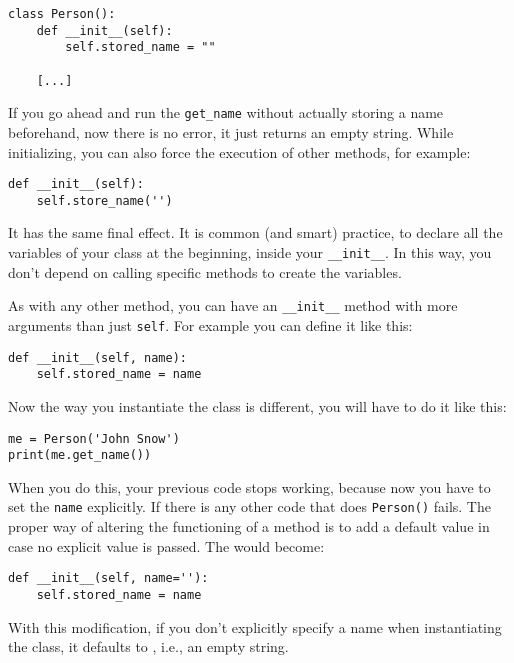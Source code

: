 \begin{verbatim}
class Person():
    def __init__(self):
        self.stored_name = ""

    [...]
\end{verbatim}

If you go ahead and run the \texttt{get_name} without actually storing a name beforehand, now there is no error, it just returns an empty string. While initializing, you can also force the execution of other methods, for example:

\begin{verbatim}
def __init__(self):
    self.store_name('')
\end{verbatim}

It has the same final effect. It is common (and smart) practice, to declare all the variables of your class at the beginning, inside your \texttt{__init__}. In this way, you don't depend on calling specific methods to create the variables.

As with any other method, you can have an \texttt{__init__} method with more arguments than just \texttt{self}. For example you can define it like this:

\begin{verbatim}
def __init__(self, name):
    self.stored_name = name
\end{verbatim}

Now the way you instantiate the class is different, you will have to do it like this:

\begin{verbatim}
me = Person('John Snow')
print(me.get_name())
\end{verbatim}

When you do this, your previous code stops working, because now you have to set the \texttt{name} explicitly. If there is any other code that does \texttt{Person()} fails. The proper way of altering the functioning of a method is to add a default value in case no explicit value is passed. The  would become:

\begin{verbatim}
def __init__(self, name=''):
    self.stored_name = name
\end{verbatim}

With this modification, if you don't explicitly specify a name when instantiating the class, it defaults to , i.e., an empty string.

